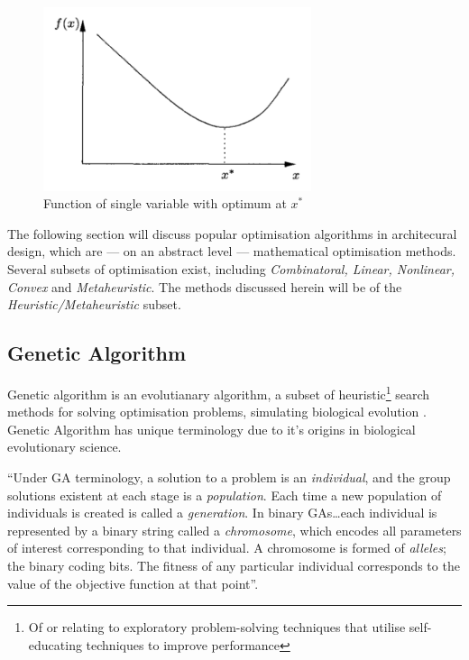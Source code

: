 \begin{figure}[htbp]
\centering
\includegraphics[width=0.7\textwidth]{./Images/19-FunctionOpt}
\caption[Function of Single Variable]{Function of single variable with optimum at $x^*$ \cite{snyman05}}
\label{fig:FunctionOpt}
\end{figure}

The following section will discuss popular optimisation algorithms in architecural design, which are --- on an abstract level --- mathematical optimisation methods. Several subsets of optimisation exist, including \emph{Combinatoral, Linear, Nonlinear, Convex} and \emph{Metaheuristic}. The methods discussed herein will be of the \emph{Heuristic/Metaheuristic} subset.

\newpage
\subsection{Genetic Algorithm}

Genetic algorithm is an evolutianary algorithm, a subset of heuristic\footnote{Of or relating to exploratory problem-solving techniques that utilise self-educating techniques to improve performance\cite{merriam03}} search methods for solving optimisation problems, simulating biological evolution \cite{fasoulaki08}. Genetic Algorithm has unique terminology due to it's origins in biological evolutionary science.

``Under GA terminology, a solution to a problem is an \emph{individual}, and the group solutions existent at each stage is a \emph{population}. Each time a new population of individuals is created is called a \emph{generation}. In binary GAs\ldots each individual is represented by a binary string called a \emph{chromosome}, which encodes all parameters of interest corresponding to that individual. A chromosome is formed of \emph{alleles}; the binary coding bits. The fitness of any particular individual corresponds to the value of the objective function at that point''. \cite{caldas01}

